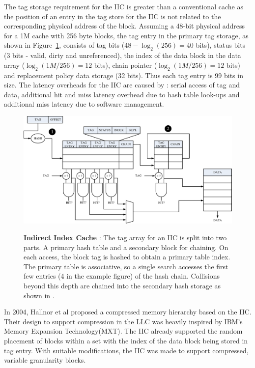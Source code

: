 The tag storage requirement for the IIC is greater than a conventional cache as the position of an entry in the tag store for the IIC is not related to the corresponding physical address of the block. Assuming a 48-bit physical address for a 1M cache with 256 byte blocks, the tag entry in the primary tag storage, as shown in Figure~\ref{fig:iic}, consists of tag bits ($48-\log_{2}(256) = 40$ bits), status bits (3 bits - valid, dirty and unreferenced), the index of the data block in the data array ($\log_{2}(1M/256) = 12$ bits), chain pointer ($\log_{2}(1M/256) = 12$ bits) and replacement policy data storage (32 bits). Thus each tag entry is 99 bits in size. The latency overheads for the IIC are caused by : serial access of tag and data, additional hit and miss latency overhead due to hash table look-ups and additional miss latency due to software management. 

\begin{figure}[h]
  \centering
  \includegraphics[width=\textwidth]{files/Figures/06-IIC.pdf}
  \\
  \caption[Indirect Index Cache]{\textbf{Indirect Index Cache} : The tag array for an IIC is split into two parts. A primary hash table and a secondary block for chaining.  On each access, the block tag is hashed to obtain a primary table index. The primary table is associative, so a single search accesses the first few entries (4 in the example figure) of the hash chain. Collisions beyond this depth are chained into the secondary hash storage as shown in .}
  \label{fig:iic}
\end{figure}

In 2004, Hallnor et al\cite{Hallnor04acompressed} proposed a compressed memory hierarchy based on the IIC. Their design to support compression in the LLC was heavily inspired by IBM's Memory Expansion Technology(MXT)\cite{Pinnacle:2001}. The IIC already supported the random placement of blocks within a set with the index of the data block being stored in tag entry. With suitable modifications, the IIC was made to support compressed, variable granularity blocks. 

